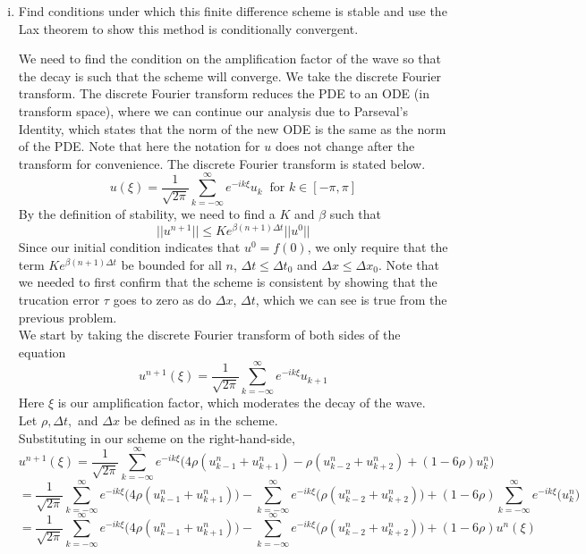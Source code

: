 \documentclass[12pt]{article}
\theoremstyle{definition}
\begin{document}
\begin{enumerate}
\begin{enumerate}[(i)]
\item Find conditions under which this finite difference scheme is stable and use the Lax theorem to show this method is conditionally convergent.

We need to find the condition on the amplification factor of the wave so that the decay is such that the scheme will converge. We take the discrete Fourier transform. The discrete Fourier transform reduces the PDE to an ODE (in transform space), where we can continue our analysis due to Parseval's Identity, which states that the norm of the new ODE is the same as the norm of the PDE. Note that here the notation for $u$ does not change after the transform for convenience. The discrete Fourier transform is stated below.
\[u(\xi) = \frac{1}{\sqrt{2\pi}} \displaystyle\sum_{k=-\infty}^{\infty}e^{-ik\xi}u_k \ \text{ for } k\in[-\pi,\pi] \]
By the definition of stability, we need to find a $K$ and $\beta$ such that 
\[\vert\vert u^{n+1}\vert\vert \leq Ke^{\beta(n+1)\Delta t}\vert\vert u^0\vert\vert\]
Since our initial condition indicates that $u^0=f(0)$, we only require that the term $Ke^{\beta(n+1)\Delta t}$ be bounded for all $n$, $\Delta t\leq\Delta t_0$ and $\Delta x\leq\Delta x_0$. Note that we needed to first confirm that the scheme is consistent by showing that the trucation error $\tau$ goes to zero as do $\Delta x$, $\Delta t$, which we can see is true from the previous problem.\\
We start by taking the discrete Fourier transform of both sides of the equation
\[u^{n+1}(\xi)= \frac{1}{\sqrt{2\pi}} \displaystyle\sum_{k=-\infty}^{\infty}e^{-ik\xi}u_{k+1}\]
Here $\xi$ is our amplification factor, which moderates the decay of the wave.\\
Let $\rho, \Delta t,$ and $\Delta x$ be defined as in the scheme.\\
Substituting in our scheme on the right-hand-side,
\[u^{n+1}(\xi)= \frac{1}{\sqrt{2\pi}} \displaystyle\sum_{k=-\infty}^{\infty}e^{-ik\xi}\big ( 4\rho(u_{k-1}^n +u_{k+1}^n) - \rho(u_{k-2}^n + u_{k+2}^n)+ (1-6\rho)u_k^n\big )\]
\[= \frac{1}{\sqrt{2\pi}} \displaystyle\sum_{k=-\infty}^{\infty}e^{-ik\xi}\big ( 4\rho(u_{k-1}^n +u_{k+1}^n)\big ) -  \displaystyle\sum_{k=-\infty}^{\infty}e^{-ik\xi}\big ( \rho(u_{k-2}^n + u_{k+2}^n)\big )+ (1-6\rho) \displaystyle\sum_{k=-\infty}^{\infty}e^{-ik\xi}\big ( u_k^n\big )\]
\[= \frac{1}{\sqrt{2\pi}} \displaystyle\sum_{k=-\infty}^{\infty}e^{-ik\xi}\big ( 4\rho(u_{k-1}^n +u_{k+1}^n)\big ) -  \displaystyle\sum_{k=-\infty}^{\infty}e^{-ik\xi}\big ( \rho(u_{k-2}^n + u_{k+2}^n)\big )+ (1-6\rho)u^n(\xi)\]

\end{enumerate}
\end{enumerate}
\end{document}

